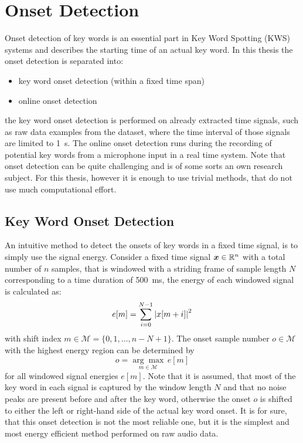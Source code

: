 
\section{Onset Detection}\label{sec:signal_onset}
\thesisStateReady
\thesisStateNew
Onset detection of key words is an essential part in Key Word Spotting (KWS) systems and describes the starting time of an actual key word.
In this thesis the onset detection is separated into:
\begin{itemize}
  \item key word onset detection (within a fixed time span)
  \item online onset detection
\end{itemize}
the key word onset detection is performed on already extracted time signals, such as raw data examples from the dataset, where the time interval of those signals are limited to \SI{1}{\second}.
The online onset detection runs during the recording of potential key words from a microphone input in a real time system.
Note that onset detection can be quite challenging and is of some sorts an own research subject.
For this thesis, however it is enough to use trivial methods, that do not use much computational effort.



\subsection{Key Word Onset Detection}\label{sec:signal_onset_kw}
An intuitive method to detect the onsets of key words in a fixed time signal, is to simply use the signal energy.
Consider a fixed time signal $\bm{x} \in \mathbb{R}^n$ with a total number of $n$ samples, that is windowed with a striding frame of sample length $N$ corresponding to a time duration of \SI{500}{\milli\second}, the energy of each windowed signal is calculated as:
\begin{equation}\label{eq:e_win}
  e[m] = \sum_{i=0}^{N-1} \abs{x[m + i]}^2
\end{equation}
with shift index $m \in \mathcal{M} = \{0, 1, \dots, n - N + 1\}$.
The onset sample number $o \in \mathcal{M}$ with the highest energy region can be determined by
\begin{equation}\label{eq:onset}
  o = \underset{m \in \mathcal{M}}{\arg \max} \, e[m]
\end{equation}
for all windowed signal energies $e[m]$.
Note that it is assumed, that most of the key word in each signal is captured by the window length $N$ and that no noise peaks are present before and after the key word, otherwise the onset $o$ is shifted to either the left or right-hand side of the actual key word onset.
It is for sure, that this onset detection is not the most reliable one, but it is the simplest and most energy efficient method performed on raw audio data.

